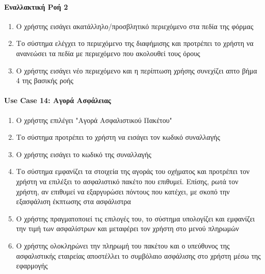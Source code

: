 \documentclass{../ol-softwaremanual}
\begin{document}
	
	
	
	\paragraph{Εναλλακτική Ροή 2}
	\begin{enumerate}
		\item Ο χρήστης εισάγει ακατάλληλο/προσβλητικό περιεχόμενο στα πεδία της φόρμας
		\item Το σύστημα ελέγχει το περιεχόμενο της διαφήμισης και προτρέπει το χρήστη να ανανεώσει τα πεδία 
		με περιεχόμενο που ακολουθεί τους όρους 
		\item Ο χρήστης εισάγει νέο περιεχόμενο και η περίπτωση χρήσης συνεχίζει απτο βήμα 4 της βασικής ροής
	\end{enumerate}
	
	\paragraph{\en Use Case 14: \gr Αγορά Ασφάλειας}
	\begin{enumerate}
		\item Ο χρήστης επιλέγει \en"\gr Αγορά Ασφαλιστικού Πακέτου\en"\gr
		\item Το σύστημα προτρέπει το χρήστη να εισάγει τον κωδικό συναλλαγής
		\item Ο χρήστης εισάγει το κωδικό της συναλλαγής
		\item Το σύστημα εμφανίζει τα στοιχεία της αγοράς του οχήματος και προτρέπει τον χρήστη να επιλέξει το ασφαλιστικό πακέτο που επιθυμεί. Επίσης, ρωτά τον χρήστη, αν επιθυμεί να εξαργυρώσει πόντους που κατέχει, με σκοπό την εξασφάλιση έκπτωσης στα ασφάλιστρα
		\item Ο χρήστης πραγματοποιεί τις επιλογές του, το σύστημα υπολογίζει και εμφανίζει την τιμή των ασφαλίστρων και μεταφέρει τον χρήστη στο μενού πληρωμών
		\item Ο χρήστης ολοκληρώνει την πληρωμή του πακέτου και ο υπεύθυνος της ασφαλιστικής εταιρείας αποστέλλει το συμβόλαιο ασφάλισης στο χρήστη μέσω της εφαρμογής 
	\end{enumerate}
	
\end{document}
